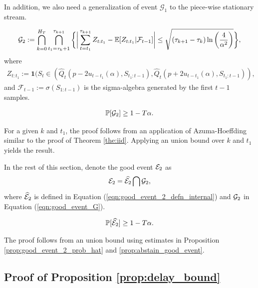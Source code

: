 {\color{black}

In addition, we also need a generalization of event $\mathcal{G}_1$ to the piece-wise stationary stream. 

\begin{align}
  {\mathcal{G}}_2:=  \bigcap_{k=0}^{H_T} \bigcap_{t_1 = \tau_k + 1}^{\tau_{k+1}}\bigg\{ \bigg| \sum_{t=t_1}^{\tau_{k+1}}Z_{t:t_1} - \mathbb{E}[Z_{t:t_1} \vert \mathcal{F}_{t-1}] \bigg| \leq \sqrt{(\tau_{k+1} - \tau_k) \ln \left( \frac{4}{\alpha^2} \right)} \bigg\},
  \label{eqn:good_event_G}
\end{align}
where 
\begin{align}
    Z_{t:t_1} := \mathbf{1}(S_{t} \in (\widehat{Q}_t(p-2u_{t-t_1}(\alpha), S_{t_1:t-1}), \widehat{Q}_t(p+2u_{t-t_1}(\alpha), S_{t_1:t-1})),
\end{align}
and $\mathcal{F}_{t-1} := \sigma(S_{1:t-1})$ is the sigma-algebra generated by the first $t-1$ samples.

\begin{proposition}
    \begin{align*}
        \mathbb{P}[{\mathcal{G}}_2] \geq 1 - T \alpha.
    \end{align*}
    \label{prop:abstain_good_event}
\end{proposition}
For a given $k$ and $t_1$, the proof follows from an application of Azuma-Hoeffding similar to the proof of Theorem \ref{the:iid}. Applying an union bound over $k$ and $t_1$ yields the result. 

In the rest of this section, denote the good event ${\mathcal{E}}_2$ as 
\begin{align}
    {\mathcal{E}}_2 = \widehat{{\mathcal{E}}_2} \bigcap {\mathcal{G}}_2,
    \label{eqn:good_event_2_defn}
\end{align}
where $\widehat{{\mathcal{E}}}_2$ is defined in Equation (\ref{eqn:good_event_2_defn_internal}) and ${\mathcal{G}}_2$ in Equation (\ref{eqn:good_event_G}).

\begin{proposition}
    \begin{align*}
        \mathbb{P}[\widehat{{\mathcal{E}}_2}] \geq 1 - T\alpha.
    \end{align*}
    \label{prop:good_event_2_prob}
\end{proposition}
The proof follows from an union bound using estimates in Proposition \ref{prop:good_event_2_prob_hat} and \ref{prop:abstain_good_event}.

}

\subsection{Proof of Proposition \ref{prop:delay_bound}}


